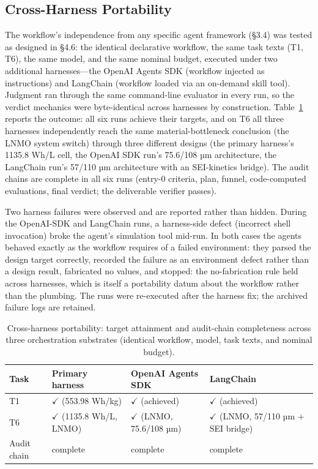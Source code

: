 \subsection{Cross-Harness Portability}
\label{sec:portability}

The workflow's independence from any specific agent framework (§3.4) was
tested as designed in §4.6: the identical declarative workflow, the same
task texts (T1, T6), the same model, and the same nominal budget, executed
under two additional harnesses---the OpenAI Agents SDK (workflow injected as
instructions) and LangChain (workflow loaded via an on-demand skill tool).
Judgment ran through the same command-line evaluator in every run,
so the verdict mechanics were byte-identical across harnesses by
construction. Table~\ref{tab:portability} reports the outcome: all six runs
achieve their targets, and on T6 all three harnesses independently reach
the same material-bottleneck conclusion (the LNMO system switch) through
three different designs (the primary harness's 1135.8 Wh/L cell, the OpenAI
SDK run's 75.6/108 µm architecture, the LangChain run's 57/110 µm
architecture with an SEI-kinetics bridge). The audit chains are complete in
all six runs (entry-0 criteria, plan, funnel, code-computed evaluations, final
verdict; the deliverable verifier passes).

Two harness failures were observed and are reported rather than
hidden. During the OpenAI-SDK and LangChain runs, a harness-side defect
(incorrect shell invocation) broke the agent's simulation tool mid-run. In
both cases the agents behaved exactly as the workflow requires of a failed
environment: they parsed the design target correctly, recorded the failure as an
environment defect rather than a design result, fabricated no values, and
stopped: the no-fabrication rule held across harnesses, which is itself a
portability datum about the workflow rather than the plumbing. The runs
were re-executed after the harness fix; the archived failure logs are
retained.

\begin{table}[!ht]
\centering
\caption{Cross-harness portability: target attainment and audit-chain
completeness across three orchestration substrates (identical workflow,
model, task texts, and nominal budget).}
\label{tab:portability}
\setlength{\tabcolsep}{2.5pt}
\begin{tabular}{p{1.2cm}p{3.0cm}p{3.3cm}p{3.5cm}}
\toprule
Task & Primary harness & OpenAI Agents SDK & LangChain \\
\midrule
T1 & $\checkmark$ (553.98 Wh/kg) & $\checkmark$ (achieved) & $\checkmark$ (achieved) \\
T6 & $\checkmark$ (1135.8 Wh/L, LNMO) & $\checkmark$ (LNMO, 75.6/108 µm) & $\checkmark$ (LNMO, 57/110 µm + SEI bridge) \\
Audit chain & complete & complete & complete \\
\bottomrule
\end{tabular}
\end{table}

